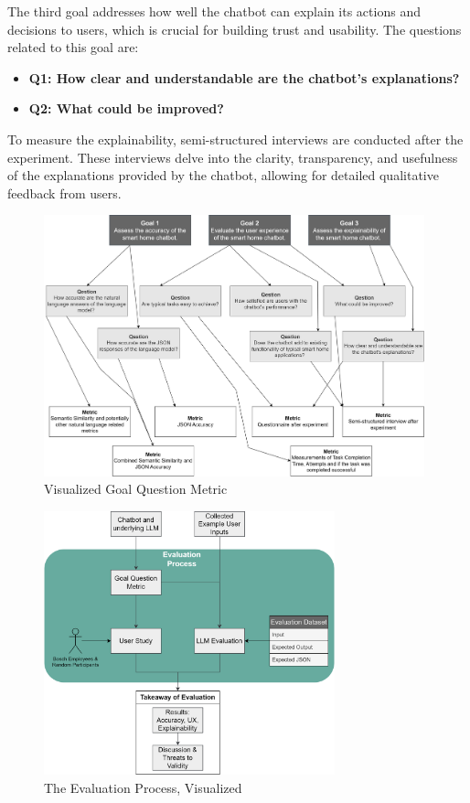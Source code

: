 The third goal addresses how well the chatbot can explain its actions and decisions to users, which is crucial for building trust and usability. The questions related to this goal are:

\begin{itemize}
    \item \textbf{Q1: How clear and understandable are the chatbot's explanations?}
    \item \textbf{Q2: What could be improved?}
\end{itemize}

To measure the explainability, semi-structured interviews are conducted after the experiment. These interviews delve into the clarity, transparency, and usefulness of the explanations provided by the chatbot, allowing for detailed qualitative feedback from users.

\begin{figure}[h]
    \centering
    \captionsetup{justification=centering}
    \includegraphics[width=0.98\textwidth]{graphics/gqm.png}
    \caption{Visualized Goal Question Metric}
    \label{fig:gqm}
\end{figure}
\begin{figure}[h]
    \centering
    \captionsetup{justification=centering}
    \includegraphics[width=0.75\textwidth]{graphics/eval-process.png}
    \caption{The Evaluation Process, Visualized}
    \label{fig:evalprocess}
\end{figure}

